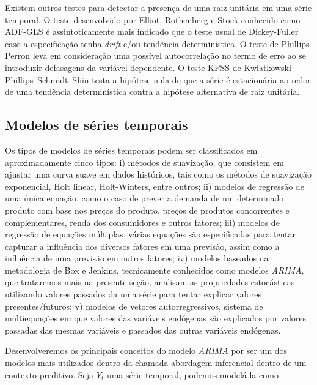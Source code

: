 \documentclass[twocolumn]{rbef}
\newcommand{\1}{\mathbbm{1}}
\begin{document}
Existem outros testes para detectar a presença de uma raiz unitária em uma série temporal. O teste desenvolvido por Elliot, Rothenberg e Stock\cite{Elliot-Rothenberg-Stock} conhecido como ADF-GLS é assintoticamente mais indicado que o teste usual de Dickey-Fuller caso a especificação tenha \textit{drift} e/ou tendência determinística. O teste de Phillips-Perron\cite{Phillips-Perron} leva em consideração uma possível autocorrelação no termo de erro ao se introduzir defasagens da variável dependente. O teste KPSS de Kwiatkowski–Phillips–Schmidt–Shin\cite{Kwiatkowski} testa a hipótese nula de que a série é estacionária ao redor de uma tendência determinística contra a hipótese alternativa de raiz unitária.

\subsection{Modelos de séries temporais} \label{arima}

Os tipos de modelos de séries temporais podem ser classificados em aproximadamente cinco tipos\cite{Gujarati}: i) métodos de suavização, que consistem em ajustar uma curva suave em dados históricos\cite{Hyndman}, tais como os métodos de suavização exponencial\cite{Brown}, Holt linear\cite{Holt}, Holt-Winters\cite{Winters}, entre outros; ii) modelos de regressão de uma única equação, como o caso de prever a demanda de um determinado produto com base nos preços do produto, preços de produtos concorrentes e complementares, renda dos consumidores e outros fatores; iii) modelos de regressão de equações múltiplas, várias equações são especificadas para tentar capturar a influência dos diversos fatores em uma previsão, assim como a influência de uma previsão em outros fatores; iv) modelos baseados na metodologia de Box e Jenkins\cite{Box-Jenkins}, tecnicamente conhecidos como modelos \textit{ARIMA}, que trataremos mais na presente seção, analisam as propriedades estocásticas utilizando valores passados da uma série para tentar explicar valores presentes/futuros; v) modelos de vetores autorregressivos, sistema de multiequações em que valores das variáveis endógenas são explicados por valores passadas das mesmas variáveis e passados das outras variáveis endógenas.

Desenvolveremos os principais conceitos do modelo \textit{ARIMA} por ser um dos modelos mais utilizados dentro da chamada abordagem inferencial dentro de um contexto preditivo. Seja $Y_{t}$ uma série temporal, podemos modelá-la como
\end{document}
